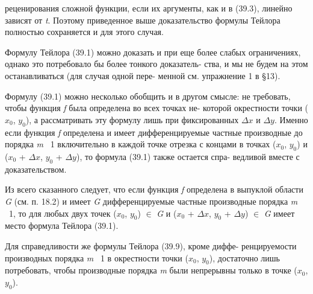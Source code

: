 \documentclass[10pt]{book}
\begin{document}
	\begin{spacing}{0.96}
	   \noindent реценирования сложной функции, если их аргументы, как и в (39.3), \linebreak
	   линейно зависят от \textit {t}. Поэтому приведенное выше доказательство \linebreak
	   формулы Тейлора полностью сохраняется и для этого случая.
	   
	   Формулу Тейлора (39.1) можно доказать и при еще более слабых \linebreak
	   ограничениях, однако это потребовало бы более тонкого доказатель-\linebreak
	   ства, и мы не будем на этом останавливаться (для случая одной пере-\linebreak
	   менной см. упражнение 1 в \S 13).
	 
	   Формулу (39.1) можно несколько обобщить и в другом смысле: \linebreak
	   не требовать, чтобы функция \textit {f} была определена во всех точках не- \linebreak
	   которой окрестности точки ($x_0$, $y_0$), а рассматривать эту формулу \linebreak
	   лишь при фиксированных $\Delta x$ и $\Delta y$. Именно если функция \textit {f} определена и имеет дифференцируемые частные производные до порядка \linebreak
	   \textit {m} \textemdash~1 включительно в каждой точке отрезка с концами в точках \linebreak
	   ($x_0$, $y_0$) и ($x_0$ +  $\Delta x$, $y_0$ + $\Delta y$), то формула (39.1) также остается спра-
	    \linebreak ведливой вместе с доказательством.
	   
	   Из всего сказанного следует, что если функция \textit {f} определена в выпуклой области \textit {G} (см. п. 18.2) и имеет \textit{G} дифференцируемые частные производные порядка \textit {m} \textemdash~1, то для любых двух точек ($x_0$, $y_0$) $\in$ \textit {G} \linebreak
	   и ($x_0$ +  $\Delta x$, $y_0$ + $\Delta y$) $\in$ \textit{G} имеет место формула Тейлора (39.1).
	   
	   Для справедливости же формулы Тейлора (39.9), кроме диффе- \linebreak
	   ренцируемости производных порядка \textit {m} \textemdash~1 в окрестности точки \linebreak
	   ($x_0$, $y_0$), достаточно лишь потребовать, чтобы производные порядка \textit {m}
	   были непрерывны только в точке ($x_0$, $y_0$).
	   

\end{spacing}
\end{document}
